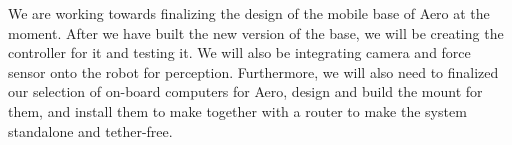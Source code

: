 \documentclass{standalone}
\begin{document}
We are working towards finalizing the design of the mobile base of Aero at the moment. After we have built the new version of the base, we will be creating the controller for it and testing it. We will also be integrating camera and force sensor onto the robot for perception. Furthermore, we will also need to finalized our selection of on-board computers for Aero, design and build the mount for them, and install them to make together with a router to make the system standalone and tether-free.
\end{document}
